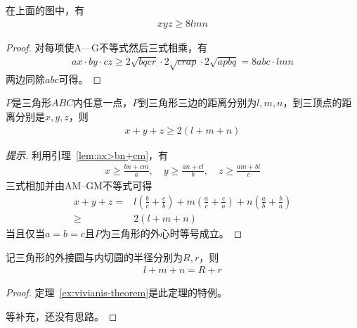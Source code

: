 \begin{lemma}
  在上面的图中，有
  \begin{align*}
    xyz\ge 8 lmn
  \end{align*}
\end{lemma}
\begin{proof}
  对每项使A—G不等式然后三式相乘，有
  \begin{align*}
    ax\cdot by\cdot cz \ge 2\sqrt{bqcr} \cdot 2\sqrt{crap} \cdot 2\sqrt{apbq}
    = 8abc \cdot lmn
  \end{align*}
  两边同除$abc$可得。
\end{proof}


\begin{theorem}
  $P$是三角形$ABC$内任意一点，$P$到三角形三边的距离分别为$l,m,n$，到三顶点的距离分别是$x,y,z$，则
  \begin{align}
    x+y+z\ge 2(l+m+n)
  \end{align}
\end{theorem}
\begin{proof}[提示]
  利用引理~\ref{lem:ax>bn+cm}，有
  \begin{align*}
    x \ge \frac{bn + cm}{a}, \quad y \ge \frac{an + cl}{b}, \quad z \ge \frac{am + bl}{c}
  \end{align*}
  三式相加并由AM--GM不等式可得
  \begin{align*}
    x + y + z ={}& l\left(\frac bc + \frac cb\right) + m\left(\frac ac + \frac ca\right) + n\left(\frac ab + \frac ba\right)\\
    \ge{}& 2(l + m + n)
  \end{align*}
  当且仅当$a=b=c$且$P$为三角形的外心时等号成立。
\end{proof}

\begin{theorem}
  记三角形的外接圆与内切圆的半径分别为$R,r$，则
  \begin{align*}
    l + m + n = R + r
  \end{align*}
\end{theorem}
\begin{proof}定理~\ref{ex:vivianis-theorem}是此定理的特例。

  \color{red}等补充，还没有思路。
\end{proof}